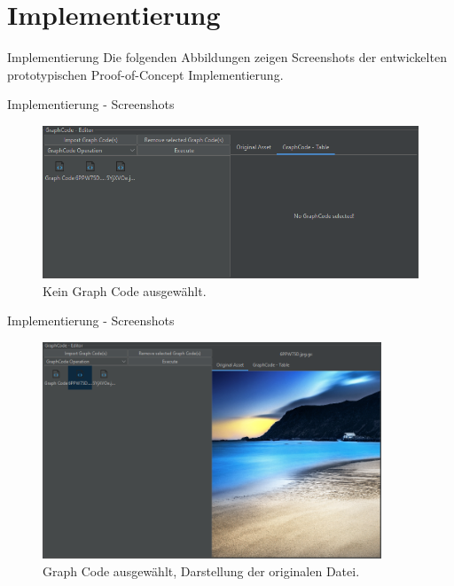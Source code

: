 \documentclass[t]{beamer}
\begin{document}
\section{Implementierung}

\begin{frame}{Implementierung}
  Die folgenden Abbildungen zeigen Screenshots der entwickelten prototypischen Proof-of-Concept Implementierung.
\end{frame}

\begin{frame}{Implementierung - Screenshots}

  \begin{figure}
    \includegraphics[width=\textwidth]{images/left_no_sel}
    \caption{Kein Graph Code ausgewählt.}
  \end{figure}

\end{frame}

\begin{frame}{Implementierung - Screenshots}

  \begin{figure}
    \includegraphics[width=0.9\textwidth]{images/left_sel_original}
    \caption{Graph Code ausgewählt, Darstellung der originalen Datei.}
  \end{figure}

\end{frame}
\end{document}
